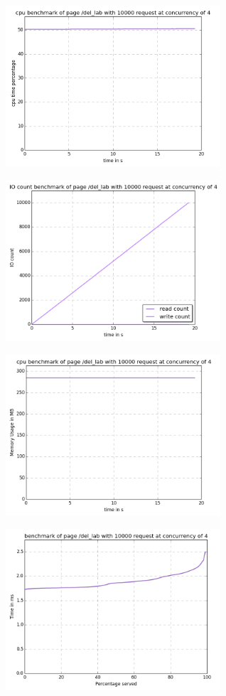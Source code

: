 \begin{center}
\includegraphics[width=0.6\textwidth]{img/del_lab.cpu.png}



\includegraphics[width=0.6\textwidth]{img/del_lab.io-count.png}



\includegraphics[width=0.6\textwidth]{img/del_lab.mem.png}



\includegraphics[width=0.6\textwidth]{img/del_lab.serv-time.png}




\end{center}
